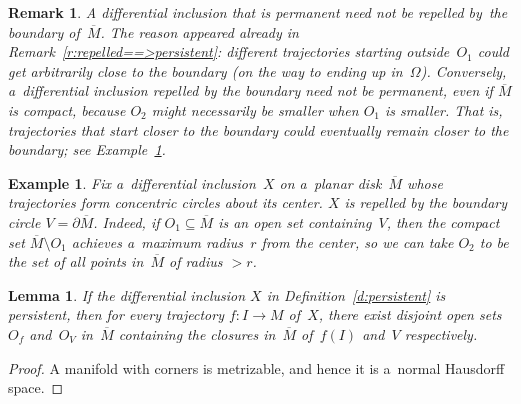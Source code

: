 \documentclass[11pt]{article}
\newtheorem{Lemma}[Theorem]{Lemma}
\newtheorem{Example}[Theorem]{Example}
\newtheorem{Remark}[Theorem]{Remark}
\newcommand\ol[1]{{\overline {#1}}}
\begin{document}
\begin{Remark}
\label{r:permanent}
A dif\/ferential inclusion that is permanent need not be repelled by~the boundary of~$\ol M$.
The reason appeared already in Remark~\ref{r:repelled==>persistent}: dif\/ferent trajectories starting outside~$O_1$
could get arbitrarily close to the boundary (on the way to ending up in~$\Omega$).
Conversely, a~dif\/ferential inclusion repelled by the boundary need not be permanent, even if $\ol M$ is compact,
because $O_2$ might necessarily be smaller when $O_1$ is smaller.
That is, trajectories that start closer to the boundary could eventually remain closer to the boundary; see
Example~\ref{e:repelled}.
\end{Remark}
\begin{Example}
\label{e:repelled}
Fix a~dif\/ferential inclusion~$X$ on a~planar disk~$\ol M$ whose trajectories form concentric circles about its center.
$X$ is repelled by the boundary circle $V=\partial\ol M$.
Indeed, if $O_1\subseteq\ol M$ is an open set containing~$V$, then the compact set $\ol M\setminus O_1$ achieves
a~maximum radius~$r$ from the center, so we can take $O_2$ to be the set of all points in~$\ol M$ of radius $>r$.
\end{Example}
\begin{Lemma}
\label{l:normal}
If the differential inclusion $X$ in Definition~{\rm \ref{d:persistent}} is persistent, then for every trajec\-tory $f:I\to
M$ of~$X$, there exist disjoint open sets~$O_f$ and~$O_V$ in~$\ol M$ containing the closures in~$\ol M$ of~$f(I)$
and~$V$ respectively.
\end{Lemma}

\begin{proof}
A manifold with corners is metrizable, and hence it is a~normal Hausdorf\/f space.
\end{proof}
\end{document}
